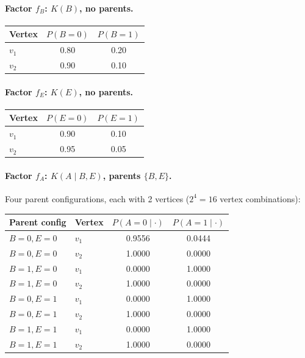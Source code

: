 \documentclass[11pt]{article}
\begin{document}
\paragraph{Factor $f_B$: $K(B)$, no parents.}
\begin{center}
\begin{tabular}{lcc}
\toprule
\textbf{Vertex} & $P(B{=}0)$ & $P(B{=}1)$ \\
\midrule
$v_1$ & 0.80 & 0.20 \\
$v_2$ & 0.90 & 0.10 \\
\bottomrule
\end{tabular}
\end{center}

\paragraph{Factor $f_E$: $K(E)$, no parents.}
\begin{center}
\begin{tabular}{lcc}
\toprule
\textbf{Vertex} & $P(E{=}0)$ & $P(E{=}1)$ \\
\midrule
$v_1$ & 0.90 & 0.10 \\
$v_2$ & 0.95 & 0.05 \\
\bottomrule
\end{tabular}
\end{center}

\paragraph{Factor $f_A$: $K(A \mid B, E)$, parents $\{B, E\}$.}
Four parent configurations, each with 2 vertices ($2^4 = 16$ vertex combinations):
\begin{center}
\begin{tabular}{llcc}
\toprule
\textbf{Parent config} & \textbf{Vertex} & $P(A{=}0 \mid \cdot)$ & $P(A{=}1 \mid \cdot)$ \\
\midrule
$B{=}0, E{=}0$ & $v_1$ & 0.9556 & 0.0444 \\
$B{=}0, E{=}0$ & $v_2$ & 1.0000 & 0.0000 \\
\midrule
$B{=}1, E{=}0$ & $v_1$ & 0.0000 & 1.0000 \\
$B{=}1, E{=}0$ & $v_2$ & 1.0000 & 0.0000 \\
\midrule
$B{=}0, E{=}1$ & $v_1$ & 0.0000 & 1.0000 \\
$B{=}0, E{=}1$ & $v_2$ & 1.0000 & 0.0000 \\
\midrule
$B{=}1, E{=}1$ & $v_1$ & 0.0000 & 1.0000 \\
$B{=}1, E{=}1$ & $v_2$ & 1.0000 & 0.0000 \\
\bottomrule
\end{tabular}
\end{center}
\end{document}
